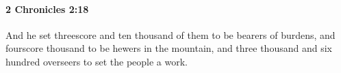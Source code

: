 
		\paragraph{2 Chronicles 2:18} %
			\label{2CHRONICLES-2-18}

			And he set threescore and ten thousand of them to be bearers of burdens, and fourscore thousand to be hewers in the mountain, and three thousand and six hundred overseers to set the people a work.

